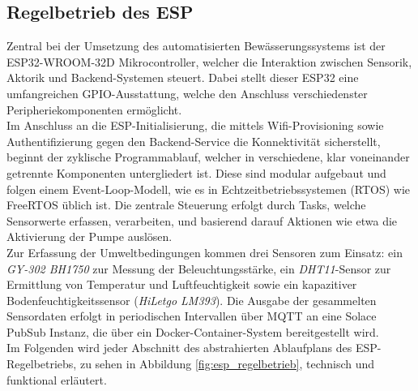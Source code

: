 \subsection{Regelbetrieb des ESP}

Zentral bei der Umsetzung des automatisierten Bewässerungssystems ist der ESP32-WROOM-32D Mikrocontroller, welcher die Interaktion zwischen Sensorik, Aktorik und Backend-Systemen steuert. Dabei stellt dieser ESP32 eine umfangreichen GPIO-Ausstattung, welche den Anschluss verschiedenster Peripheriekomponenten ermöglicht.
\\
Im Anschluss an die ESP-Initialisierung, die mittels Wifi-Provisioning sowie Authentifizierung gegen den Backend-Service die Konnektivität sicherstellt, beginnt der zyklische Programmablauf, welcher in verschiedene, klar voneinander getrennte Komponenten untergliedert ist. Diese sind modular aufgebaut und folgen einem Event-Loop-Modell, wie es in Echtzeitbetriebssystemen (RTOS) wie FreeRTOS üblich ist. Die zentrale Steuerung erfolgt durch Tasks, welche Sensorwerte erfassen, verarbeiten, und basierend darauf Aktionen wie etwa die Aktivierung der Pumpe auslösen.
\\
Zur Erfassung der Umweltbedingungen kommen drei Sensoren zum Einsatz: ein \textit{GY-302 BH1750} zur Messung der Beleuchtungsstärke, ein \textit{DHT11}-Sensor zur Ermittlung von Temperatur und Luftfeuchtigkeit sowie ein kapazitiver Bodenfeuchtigkeitssensor (\textit{HiLetgo LM393}). Die Ausgabe der gesammelten Sensordaten erfolgt in periodischen Intervallen über MQTT an eine Solace PubSub Instanz, die über ein Docker-Container-System bereitgestellt wird.
\\
Im Folgenden wird jeder Abschnitt des abstrahierten Ablaufplans des ESP-Regelbetriebs, zu sehen in Abbildung \vref{fig:esp_regelbetrieb}, technisch und funktional erläutert.


